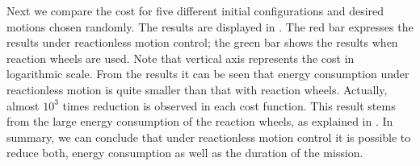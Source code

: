 Next we compare the cost for five different initial configurations and desired motions 
chosen randomly. The results are displayed  in .
The red bar expresses the results under reactionless motion control;
the green bar shows the results when reaction wheels are used.
Note that vertical  axis  represents the cost in logarithmic scale.
From the results it can be seen that energy consumption under reactionless motion 
is quite smaller than that with reaction wheels.
Actually, almost $10^{3}$ times reduction is observed in each cost function.
This result stems from the large energy consumption of the reaction wheels, as explained in .
In summary, we can conclude that under reactionless motion control it is possible to reduce
both, energy consumption as well as the duration of the mission.
%
